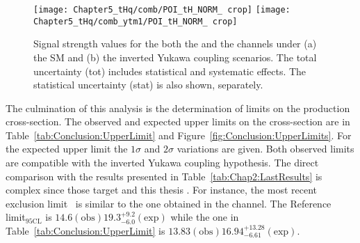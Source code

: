 \begin{figure}[h] 
\centering
  \texttt{[image: Chapter5\_tHq/comb/POI\_tH\_NORM\_ crop]}
  \texttt{[image: Chapter5\_tHq/comb\_ytm1/POI\_tH\_NORM\_ crop]}
\caption{Signal strength values for the both the \dilepOStau and the \dilepSStau channels
under (a) the SM and (b) the inverted Yukawa coupling scenarios.
The total uncertainty (tot) includes statistical and systematic effects. 
The statistical uncertainty (stat) is also shown, separately.}
\label{fig:Conclusion:POIs}
\end{figure}


The culmination of this analysis is the determination of limits on the \tHq production cross-section.
The observed and expected upper limits on the \tHq cross-section are in Table~\ref{tab:Conclusion:UpperLimit} and Figure~\ref{fig:Conclusion:UpperLimits}. 
For the expected upper limit  the $1\sigma$ and $2\sigma$ variations are given.
Both observed limits are compatible with the inverted Yukawa coupling hypothesis. 
The direct comparison with the results presented in Table~\ref{tab:Chap2:LastResults} is complex since those target \tH and this thesis \tHq. For instance, the most recent exclusion limit~\cite{CMS-PAS-HIG-19-011} is similar to the one obtained in the \dilepSStau channel.
The Reference~\cite{CMS-PAS-HIG-19-011} limit$_{\text{95CL}}$ is $14.6(\text{obs}) 19.3^{+9.2}_{-6.0}(\text{exp})$ while the one in Table~\ref{tab:Conclusion:UpperLimit} is  $13.83(\text{obs}) 16.94^{+13.28}_{-6.61}(\text{exp})$. 


